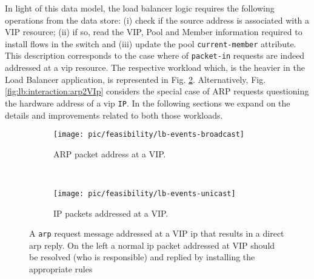 \begin{figure}[ht]
\TopFloatBoxes
\begin{floatrow}


\end{floatrow}
\end{figure}

In light of this data model, the load balancer logic requires the following
operations from the data store: (i) check if the source address is
associated with a VIP resource; (ii) if so, read the VIP, Pool and
Member information required to install flows in the switch and (iii)
update the pool \texttt{current-member} attribute. This description
corresponds to the case where \gls{of} \texttt{packet-in} requests are indeed addressed at a \gls{vip}
resource. The respective workload which, is the heavier in
the Load Balancer application, is represented in Fig. \ref{fig:lb:interaction:ip2Vip}. Alternatively, Fig. 
\ref{fig:lb:interaction:arp2VIp}  considers the special case of ARP requests questioning the hardware
address of a \gls{vip} \texttt{IP}. In the following sections we
expand on the details and improvements related to both those
workloads. 

\begin{figure}
  \centering
  \begin{subfigure}[b]{0.5\textwidth}
                \centering
                \texttt{[image: pic/feasibility/lb-events-broadcast]}
                \caption{ARP packet address at a VIP.}
                \label{fig:lb:interaction:arp2Vip}
        \end{subfigure}%
        ~
        \begin{subfigure}[b]{0.5\textwidth}
                \centering
                \texttt{[image: pic/feasibility/lb-events-unicast]}
                \caption{IP packets addressed at a VIP. }
                \label{fig:lb:interaction:ip2Vip}
        \end{subfigure}
        \caption[Load Balancer workload events]{A \texttt{\gls{arp}} request message addressed at a VIP \gls{ip} that results in a direct \gls{arp} reply. On the left a normal \gls{ip} packet addressed at VIP should be resolved (who is responsible) and replied by installing the appropriate rules}  
        \label{fig:lb:interaction}
\end{figure}

